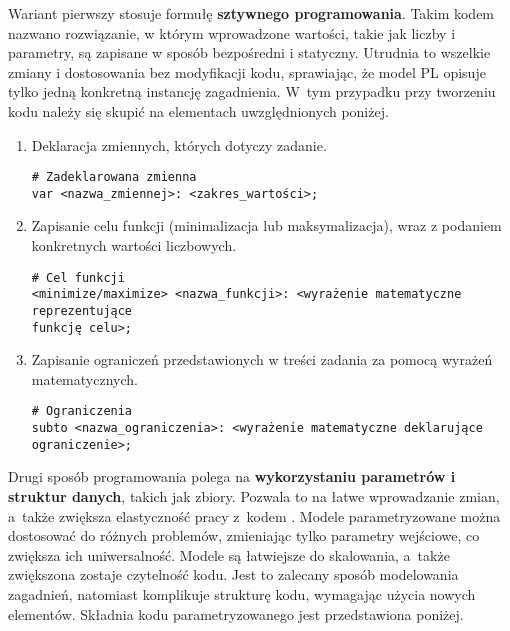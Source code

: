 Wariant pierwszy stosuje formułę \textbf{sztywnego programowania}. Takim kodem nazwano rozwiązanie, w którym wprowadzone wartości, takie jak liczby i parametry, są zapisane w sposób bezpośredni i statyczny. Utrudnia to wszelkie zmiany i dostosowania bez modyfikacji kodu, sprawiając, że model PL opisuje tylko jedną konkretną instancję zagadnienia. W~tym przypadku przy tworzeniu kodu   należy się skupić na elementach uwzględnionych poniżej.

\begin{enumerate}
\item Deklaracja zmiennych, których dotyczy zadanie.

\begin{lstlisting}[language=zimpl]
# Zadeklarowana zmienna
var <nazwa_zmiennej>: <zakres_wartości>;
\end{lstlisting}

\item Zapisanie celu funkcji (minimalizacja lub maksymalizacja), wraz z podaniem konkretnych wartości liczbowych.

\begin{lstlisting}[language=zimpl]
# Cel funkcji
<minimize/maximize> <nazwa_funkcji>: <wyrażenie matematyczne reprezentujące
funkcję celu>;
\end{lstlisting}

\item Zapisanie ograniczeń przedstawionych w treści zadania za pomocą wyrażeń matematycznych.

\begin{lstlisting}[language=zimpl]
# Ograniczenia
subto <nazwa_ograniczenia>: <wyrażenie matematyczne deklarujące ograniczenie>;
\end{lstlisting}
\end{enumerate}

Drugi sposób programowania polega na \textbf{wykorzystaniu parametrów i struktur danych}, takich jak zbiory. Pozwala to na łatwe wprowadzanie zmian, a~także zwiększa elastyczność pracy z~kodem . Modele parametryzowane można dostosować do różnych problemów, zmieniając tylko parametry wejściowe, co zwiększa ich uniwersalność. Modele są łatwiejsze do skalowania, a~także zwiększona zostaje czytelność kodu. Jest to zalecany sposób modelowania zagadnień, natomiast komplikuje strukturę kodu, wymagając użycia nowych elementów. Składnia kodu parametryzowanego jest przedstawiona poniżej.

